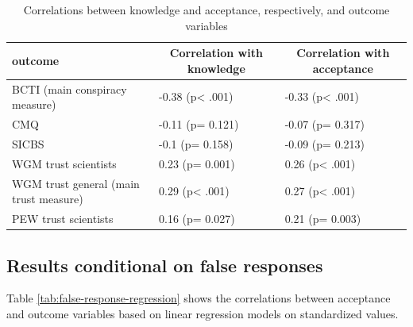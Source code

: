 \documentclass[
  doc,floatsintext]{apa6}
\begin{document}
\begin{table}[tbp]

\begin{center}
\begin{threeparttable}

\caption{\label{tab:correlations-outcomes}Correlations between knowledge and acceptance, respectively, and outcome variables}

\begin{tabular}{lll}
\toprule
outcome & \multicolumn{1}{c}{Correlation with knowledge} & \multicolumn{1}{c}{Correlation with acceptance}\\
\midrule
BCTI 
(main conspiracy measure) & -0.38 (p< .001) & -0.33 (p< .001)\\
CMQ & -0.11 (p= 0.121) & -0.07 (p= 0.317)\\
SICBS & -0.1 (p= 0.158) & -0.09 (p= 0.213)\\
WGM trust scientists & 0.23 (p= 0.001) & 0.26 (p< .001)\\
WGM trust general 
(main trust measure) & 0.29 (p< .001) & 0.27 (p< .001)\\
PEW trust scientists & 0.16 (p= 0.027) & 0.21 (p= 0.003)\\
\bottomrule
\end{tabular}

\end{threeparttable}
\end{center}

\end{table}

\subsection{Results conditional on false responses}\label{results-conditional-on-false-responses}

Table \ref{tab:false-response-regression} shows the correlations between acceptance and outcome variables based on linear regression models on standardized values.
\end{document}
